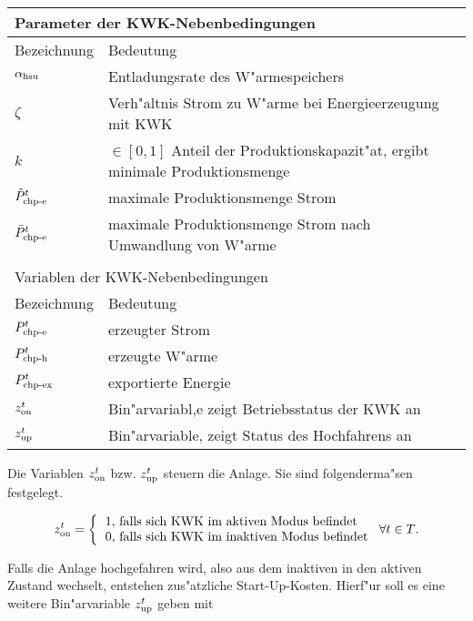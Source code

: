 \begin{tabular}{l l}
\multicolumn{2}{l}{Parameter der KWK-Nebenbedingungen}\\
\hline
Bezeichnung & Bedeutung \\
\hline
$\alpha_{\text{hsu}}$ & Entladungsrate des W"armespeichers \\
$\zeta$ & Verh"altnis Strom zu W"arme bei Energieerzeugung mit KWK \\
$k$ & $\in [0,1]$ Anteil der Produktionskapazit"at, ergibt minimale Produktionsmenge  \\
$\hat P^t_{\text{chp-e}}$ & maximale Produktionsmenge Strom \\
$\bar P^t_{\text{chp-e}}$ & maximale Produktionsmenge Strom nach Umwandlung von W"arme  \\\\
\multicolumn{2}{l}{Variablen der KWK-Nebenbedingungen}\\
\hline
Bezeichnung & Bedeutung \\
\hline
$P^t_{\text{chp-e}}$ & erzeugter Strom \\
$P^t_{\text{chp-h}}$ & erzeugte W"arme \\
$P^t_{\text{chp-ex}}$ & exportierte Energie \\
$z^t_{\text{on}}$ & Bin"arvariabl,e zeigt Betriebsstatus der KWK an \\
$z^t_{\text{up}}$ & Bin"arvariable, zeigt Status des Hochfahrens an
\end{tabular}

Die Variablen $z^t_{\text{on}}$ bzw. $z^t_{\text{up}}$ steuern die Anlage. Sie sind folgenderma"sen festgelegt.

\begin{align*}
\zon = \left \{ 
\begin{tabular}{l}
1, \text{falls sich KWK im aktiven Modus befindet} \\
0, \text{falls sich KWK im inaktiven Modus befindet}
\end{tabular}
\right.
\forall t \in T \text{.}
\end{align*}

Falls die Anlage hochgefahren wird, also aus dem inaktiven in den aktiven Zustand wechselt, entstehen zus"atzliche Start-Up-Kosten. Hierf"ur soll es eine weitere Bin"arvariable $z^t_{\text{up}}$ geben mit 

